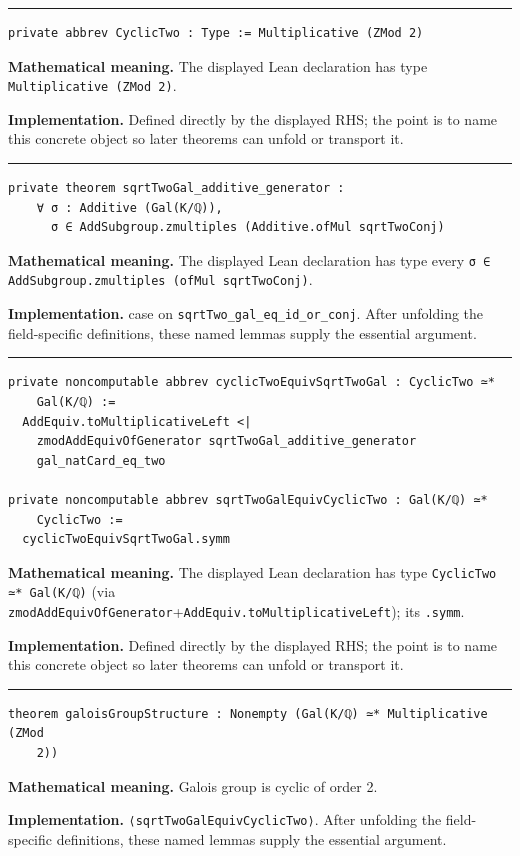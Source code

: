 \documentclass[UTF8,a4paper,11pt,fontset=fandol]{ctexart}
\theoremstyle{definition}
\newcommand{\statementsep}{\par\medskip\hrule\medskip}
\begin{document}
\statementsep
\begin{verbatim}
private abbrev CyclicTwo : Type := Multiplicative (ZMod 2)
\end{verbatim}
\noindent\textbf{Mathematical meaning.} The displayed Lean declaration has type \texttt{Multiplicative (ZMod 2)}.\par
\noindent\textbf{Implementation.} Defined directly by the displayed RHS; the point is to name this concrete object so later theorems can unfold or transport it.\par
\statementsep
\begin{verbatim}
private theorem sqrtTwoGal_additive_generator :
    ∀ σ : Additive (Gal(K/ℚ)),
      σ ∈ AddSubgroup.zmultiples (Additive.ofMul sqrtTwoConj)
\end{verbatim}
\noindent\textbf{Mathematical meaning.} The displayed Lean declaration has type every \texttt{σ ∈ AddSubgroup.\allowbreak{}zmultiples (ofMul sqrtTwoConj)}.\par
\noindent\textbf{Implementation.} case on \texttt{sqrtTwo\_\allowbreak{}gal\_\allowbreak{}eq\_\allowbreak{}id\_\allowbreak{}or\_\allowbreak{}conj}. After unfolding the field-specific definitions, these named lemmas supply the essential argument.\par
\statementsep
\begin{verbatim}
private noncomputable abbrev cyclicTwoEquivSqrtTwoGal : CyclicTwo ≃*
    Gal(K/ℚ) :=
  AddEquiv.toMultiplicativeLeft <|
    zmodAddEquivOfGenerator sqrtTwoGal_additive_generator
    gal_natCard_eq_two

private noncomputable abbrev sqrtTwoGalEquivCyclicTwo : Gal(K/ℚ) ≃*
    CyclicTwo :=
  cyclicTwoEquivSqrtTwoGal.symm
\end{verbatim}
\noindent\textbf{Mathematical meaning.} The displayed Lean declaration has type \texttt{CyclicTwo ≃* Gal(K/\allowbreak{}ℚ)} (via \texttt{zmodAddEquivOfGenerator}+\texttt{AddEquiv.\allowbreak{}toMultiplicativeLeft}); its \texttt{.\allowbreak{}symm}.\par
\noindent\textbf{Implementation.} Defined directly by the displayed RHS; the point is to name this concrete object so later theorems can unfold or transport it.\par
\statementsep
\begin{verbatim}
theorem galoisGroupStructure : Nonempty (Gal(K/ℚ) ≃* Multiplicative (ZMod
    2))
\end{verbatim}
\noindent\textbf{Mathematical meaning.} Galois group is cyclic of order 2.\par
\noindent\textbf{Implementation.} \texttt{⟨sqrtTwoGalEquivCyclicTwo⟩}. After unfolding the field-specific definitions, these named lemmas supply the essential argument.\par
\end{document}
